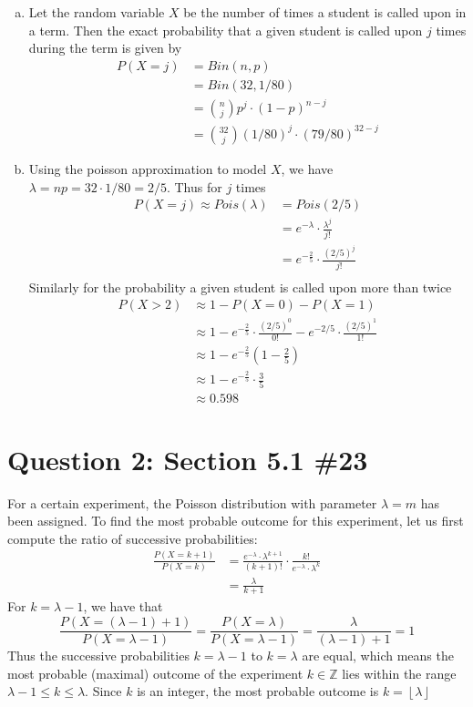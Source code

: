 \documentclass[11pt, oneside]{article}   	%
\begin{document}
\begin{enumerate}[(a)]
	\item Let the random variable $X$ be the number of times a student is called upon in a term. Then the exact probability that a given student is called upon $j$ times during the term is given by
	\begin{align*}
		P(X=j) & = Bin(n,p) \\
		& = Bin(32, 1/80) \\
		& = {n \choose j} p^j \cdot (1-p)^{n-j} \\
		& = {32 \choose j} (1/80)^j \cdot (79/80)^{32-j}
	\end{align*}
	
	\item Using the poisson approximation to model $X$, we have $\lambda = np = 32 \cdot 1/80 = 2/5$. Thus for $j$ times
	\begin{align*}
		P(X=j) \approx Pois(\lambda) & = Pois(2/5) \\
		& = e^{-\lambda} \cdot \frac{\lambda^j}{j!} \\
		& = e^{-\frac{2}{5}} \cdot \frac{(2/5)^j}{j!} \\
	\end{align*}
	Similarly for the probability a given student is called upon more than twice
	\begin{align*}
		P(X> 2) & \approx 1 - P(X=0) - P(X=1) \\
		& \approx 1 - e^{-\frac{2}{5}} \cdot \frac{(2/5)^0}{0!} - e^{-2/5} \cdot \frac{(2/5)^1}{1!} \\
		& \approx 1 - e^{-\frac{2}{5}} (1- \frac{2}{5}) \\
		& \approx 1 - e^{-\frac{2}{5}} \cdot \frac{3}{5} \\
		& \approx 0.598
	\end{align*}
	
\end{enumerate}

\section*{Question 2: Section 5.1 \#23}

For a certain experiment, the Poisson distribution with parameter $\lambda = m$ has been assigned. To find the most probable outcome for this experiment, let us first compute the ratio of successive probabilities:
\begin{align*}
	\frac{P(X=k+1)}{P(X=k)} & = \frac{e^{-\lambda} \cdot \lambda^{k+1}}{(k+1)!} \cdot \frac{k!}{e^{-\lambda} \cdot \lambda^k} \\
	& = \frac{\lambda}{k+1}
\end{align*}
For $k=\lambda -1$, we have that
$$\frac{P(X=(\lambda -1)+1)}{P(X=\lambda -1)} = \frac{P(X=\lambda)}{P(X=\lambda -1)} = \frac{\lambda}{(\lambda -1)+1} = 1$$
Thus the successive probabilities $k=\lambda -1$ to $k=\lambda$ are equal, which means the most probable (maximal) outcome of the experiment $k\in \mathbb{Z}$ lies within the range $\lambda -1 \leq k \leq \lambda$. Since $k$ is an integer, the most probable outcome is $k = \left \lfloor{\lambda}\right \rfloor$
\end{document}
